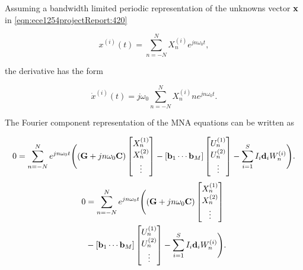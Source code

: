 Assuming a bandwidth limited periodic representation of the unknowns vector \( \mathbf{x} \) in \cref{eqn:ece1254projectReport:420}

\begin{equation}\label{eqn:ece1254projectReport:500}
x^{(i)}(t) = \sum_{n=-N}^N X_n^{(i)} e^{j n \omega_0 t},
\end{equation}

the derivative has the form

\begin{equation}\label{eqn:ece1254projectReport:520}
\dot{x}^{(i)}(t) = j \omega_0 \sum_{n=-N}^N X_n^{(i)} n e^{j n \omega_0 t}.
\end{equation}

The Fourier component representation of the MNA equations can be written as

\singleAndDoubleColumnVariations
{
\begin{dmath}\label{eqn:ece1254projectReport:600}
0 = \sum_{n = -N}^N e^{j n \omega_0 t}
\Biglr{
   \lr{ \BG + j n \omega_0 \BC }
\begin{bmatrix}
X_n^{(1)} \\
X_n^{(2)} \\
\vdots \\
\end{bmatrix}
-
[ \Bb_1 \cdots \Bb_M ]
\begin{bmatrix}
U_n^{(1)} \\
U_n^{(2)} \\
\vdots \\
\end{bmatrix}
- \sum_{i = 1}^S I_i \Bd_i
W_n^{(i)}
}.
\end{dmath}
}
{
\begin{equation}\label{eqn:ece1254projectReport:600}
\begin{aligned}
0 &= \sum_{n = -N}^N e^{j n \omega_0 t}
\Biglr{
   \lr{ \BG + j n \omega_0 \BC }
\begin{bmatrix}
X_n^{(1)} \\
X_n^{(2)} \\
\vdots \\
\end{bmatrix} \\
&-
[ \Bb_1 \cdots \Bb_M ]
\begin{bmatrix}
U_n^{(1)} \\
U_n^{(2)} \\
\vdots \\
\end{bmatrix}
- \sum_{i = 1}^S I_i \Bd_i
W_n^{(i)}
}.
\end{aligned}
\end{equation}
}

